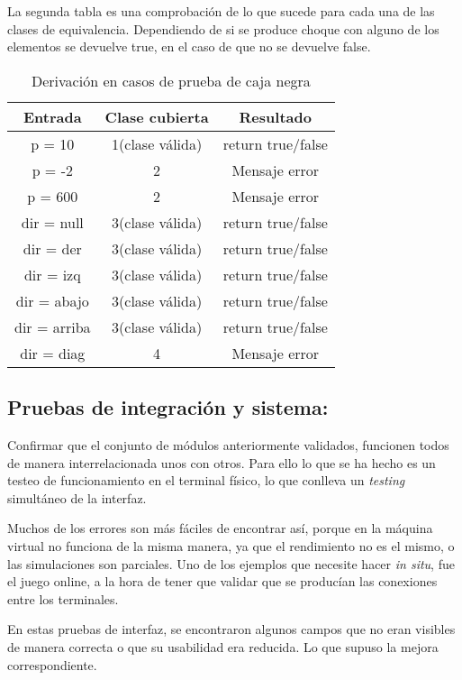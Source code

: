 La segunda tabla es una comprobación de lo que sucede para cada una de las clases de equivalencia. Dependiendo de si se produce choque con alguno de los elementos se devuelve true, en el caso de que no se devuelve false.
\begin{table}[H]
	\begin{center}
		\begin{tabular}{ccc}
			\hline
			Entrada		& Clase cubierta		& Resultado \\ \hline
			p =	10		&1(clase válida)		&return true/false\\
			p =	-2		&2						&Mensaje error\\
			p =	600		&2						&Mensaje error\\
			dir = null  &3(clase válida)		&return true/false\\
			dir = der   &3(clase válida)		&return true/false\\
			dir = izq   &3(clase válida)		&return true/false\\
			dir = abajo &3(clase válida)		&return true/false\\
			dir = arriba&3(clase válida)		&return true/false\\
			dir = diag	&4						&Mensaje error\\
		\end{tabular}
		\caption{Derivación en casos de prueba de caja negra}
		\label{table:derivacion}
	\end{center}
\end{table}

\subsection{Pruebas de integración y sistema:}
Confirmar que el conjunto de módulos anteriormente validados, funcionen todos de manera interrelacionada unos con otros. Para ello lo que se ha hecho es un testeo de funcionamiento en el terminal físico, lo que conlleva un \emph{testing} simultáneo de la interfaz. 

Muchos de los errores son más fáciles de encontrar así, porque en la máquina virtual no funciona de la misma manera, ya que el rendimiento no es el mismo, o las simulaciones son parciales. Uno de los ejemplos que necesite hacer \emph{in situ}, fue el juego online, a la hora de tener que validar que se producían las conexiones entre los terminales.

En estas pruebas de interfaz, se encontraron algunos campos que no eran visibles de manera correcta o que su usabilidad era reducida. Lo que supuso la mejora correspondiente.

